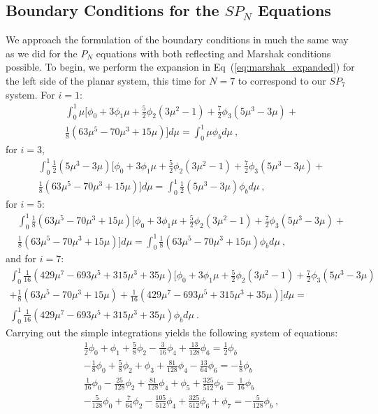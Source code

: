 \subsection{Boundary Conditions for the $SP_N$ Equations}
\label{subsec:spn_boundary_conditions}
We approach the formulation of the boundary conditions in much the
same way as we did for the $P_N$ equations with both reflecting and
Marshak conditions possible. To begin, we perform the expansion in
Eq~(\ref{eq:marshak_expanded}) for the left side of the planar system,
this time for $N=7$ to correspond to our $SP_7$ system. For $i=1$:
\begin{multline}
  \int_0^1 \mu \Bigg[ \phi_0 + 3\phi_1\mu +
    \frac{5}{2}\phi_2(3\mu^2-1) + \frac{7}{2}\phi_3(5\mu^3-3\mu)
    +\\ \frac{1}{8}(63\mu^5-70\mu^3+15\mu) \Bigg] d\mu = \int_0^1 \mu
  \phi_b d\mu\:,
  \label{eq:spn_bnd_p1}
\end{multline}
for $i=3$,
\begin{multline}
  \int_0^1 \frac{1}{2}(5\mu^3-3\mu) \Bigg[ \phi_0 + 3\phi_1\mu +
    \frac{5}{2}\phi_2(3\mu^2-1) + \frac{7}{2}\phi_3(5\mu^3-3\mu) +\\
    \frac{1}{8}(63\mu^5-70\mu^3+15\mu) \Bigg] d\mu = \int_0^1
  \frac{1}{2}(5\mu^3-3\mu) \phi_b d\mu\:,
  \label{eq:spn_bnd_p3}
\end{multline}
for $i=5$:
\begin{multline}
  \int_0^1 \frac{1}{8}(63\mu^5-70\mu^3+15\mu) \Bigg[ \phi_0 + 3\phi_1\mu +
    \frac{5}{2}\phi_2(3\mu^2-1) + \frac{7}{2}\phi_3(5\mu^3-3\mu) +\\
    \frac{1}{8}(63\mu^5-70\mu^3+15\mu) \Bigg] d\mu = \int_0^1
  \frac{1}{8}(63\mu^5-70\mu^3+15\mu) \phi_b d\mu\:,
  \label{eq:spn_bnd_p5}
\end{multline}
and for $i=7$:
\begin{multline}
  \int_0^1 \frac{1}{16}(429\mu^7-693\mu^5+315\mu^3+35\mu) \Bigg[
    \phi_0 + 3\phi_1\mu + \frac{5}{2}\phi_2(3\mu^2-1) +
    \frac{7}{2}\phi_3(5\mu^3-3\mu) \\+
    \frac{1}{8}(63\mu^5-70\mu^3+15\mu) +
    \frac{1}{16}(429\mu^7-693\mu^5+315\mu^3+35\mu) \Bigg] d\mu =\\
  \int_0^1 \frac{1}{16}(429\mu^7-693\mu^5+315\mu^3+35\mu) \phi_b
  d\mu\:.
  \label{eq:spn_bnd_p7}
\end{multline}
Carrying out the simple integrations yields the following system of
equations:
\begin{subequations}
  \begin{gather}
    \frac{1}{2}\phi_0 + \phi_1 + \frac{5}{8}\phi_2 -
    \frac{3}{16}\phi_4 + \frac{13}{128}\phi_6 =
    \frac{1}{2}\phi_{b}\\ -\frac{1}{8}\phi_0 + \frac{5}{8}\phi_2 +
    \phi_3 + \frac{81}{128}\phi_4 - \frac{13}{64}\phi_6 =
    -\frac{1}{8}\phi_{b}\\ \frac{1}{16}\phi_0 - \frac{25}{128}\phi_2 +
    \frac{81}{128}\phi_4 + \phi_5 + \frac{325}{512}\phi_6 =
    \frac{1}{16}\phi_{b}\\ -\frac{5}{128}\phi_0 + \frac{7}{64}\phi_2 -
    \frac{105}{512}\phi_4 + \frac{325}{512}\phi_6 + \phi_7 =
    -\frac{5}{128}\phi_{b}\:,
  \end{gather}
  \label{eq:spn_bnd_integrated}
\end{subequations}

